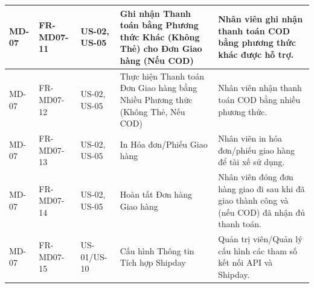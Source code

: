 \begin{longtable}{|m{2cm}|m{2.5cm}|m{2.5cm}|m{4.5cm}|m{4cm}|}
\hline
MD-07 & FR-MD07-11 & US-02, US-05 & Ghi nhận Thanh toán bằng Phương thức Khác (Không Thẻ) cho Đơn Giao hàng (Nếu COD) & Nhân viên ghi nhận thanh toán COD bằng phương thức khác được hỗ trợ. \\
\hline
MD-07 & FR-MD07-12 & US-02, US-05 & Thực hiện Thanh toán Đơn Giao hàng bằng Nhiều Phương thức (Không Thẻ, Nếu COD) & Nhân viên nhận thanh toán COD bằng nhiều phương thức. \\
\hline
MD-07 & FR-MD07-13 & US-02, US-05 & In Hóa đơn/Phiếu Giao hàng & Nhân viên in hóa đơn/phiếu giao hàng để tài xế sử dụng. \\
\hline
MD-07 & FR-MD07-14 & US-02, US-05 & Hoàn tất Đơn hàng Giao hàng & Nhân viên đóng đơn hàng giao đi sau khi đã giao thành công và (nếu COD) đã nhận đủ thanh toán. \\
\hline
MD-07 & FR-MD07-15 & US-01/US-10 & Cấu hình Thông tin Tích hợp Shipday & Quản trị viên/Quản lý cấu hình các tham số kết nối API và Shipday. \\
\hline

\end{longtable}



